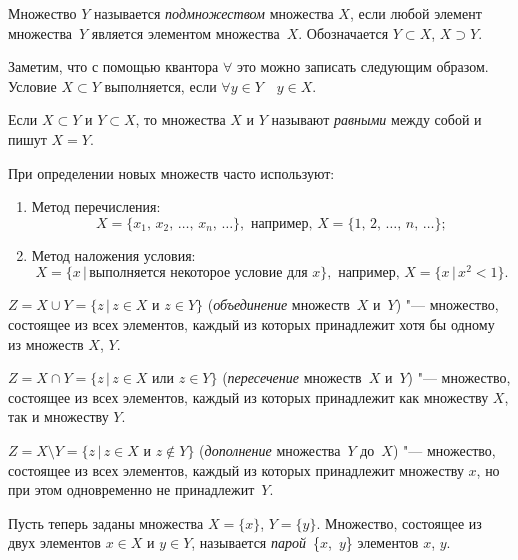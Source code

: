 \begin{defn}
Множество $Y$ называется \textit{подмножеством} множества $X$, если любой элемент множества~$Y$ является элементом множества~$X$. Обозначается $Y \subset X$, $X \supset Y$.
\end{defn}

Заметим, что с помощью квантора $\forall$ это можно записать следующим образом. Условие $X \subset Y$ выполняется, если $\forall y\in Y\quad  y\in X$. 

\begin{defn}
Если $X \subset Y$ и $Y \subset X$, то множества $X$ и $Y$ называют \textit{равными} между собой и пишут $X = Y$.
\end{defn}


При определении новых множеств часто используют:
\begin{enumerate}[wide, labelwidth=!, noitemsep]
\item 
Метод перечисления: 
$$
X = \{x_1,\,x_2,\,\dots,\,x_n,\,\dots \}, \text{ например, }
X = \{1,\, 2,\, \dots,\, n,\, \dots \};
$$

\item Метод наложения условия: 
$$
X = \{x\,\big|\, \text{выполняется некоторое условие для $x$}\}, \text{ например, }
X = \{x\,\big|\,x^2 < 1\}.
$$
\end{enumerate}

\begin{defn}
$Z = X \cup Y = \{z\,\big|\, z\in X \text{ и } z\in Y\}$ (\textit{объединение} множеств~$X$ и~$Y$) "--- множество, состоящее из всех элементов, каждый из которых принадлежит хотя бы одному из множеств $X$, $Y$.
\end{defn}
\begin{defn}
$Z = X \cap Y = \{z\,\big|\, z\in X \text{ или } z\in Y\}$ (\textit{пересечение} множеств~$X$ и~$Y$) "--- множество, состоящее из всех элементов, каждый из которых принадлежит как множеству $X$, так и множеству $Y$.
\end{defn}
\begin{defn}
$Z =X \setminus Y = \{z\,\big|\, z\in X \text{ и } z\notin Y\}$ (\textit{дополнение} множества~$Y$ до~$X$) "--- множество, состоящее из всех элементов, каждый из которых принадлежит множеству $x$, но при этом одновременно не принадлежит~$Y$.
\end{defn}

\begin{defn}
Пусть теперь заданы множества $X= \{x\}$, $Y = \{y\}$. Множество, состоящее из двух элементов $x\in X$ и $y\in Y$, называется \textit{парой}~\{$x$,~$y$\} элементов $x$, $y$. 
\end{defn}

